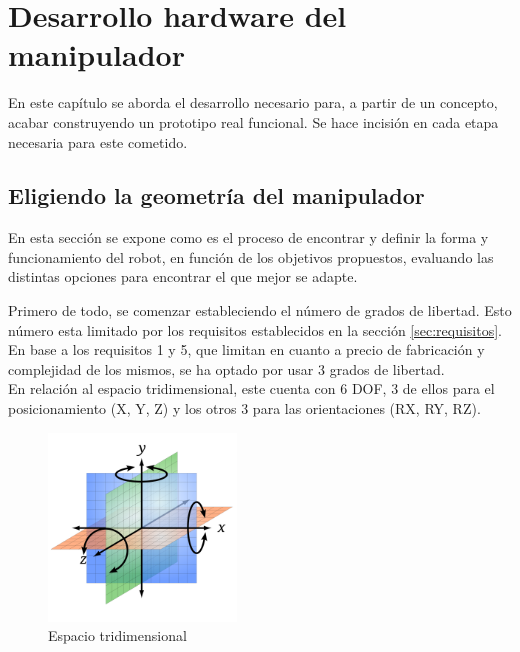 \chapter{Desarrollo hardware del manipulador}
\label{cap:capitulo5}

\vspace{1cm}

\noindent En este capítulo se aborda el desarrollo necesario para, a partir de un concepto, acabar construyendo un prototipo real funcional. Se 
hace incisión en cada etapa necesaria para este cometido.

\section{Eligiendo la geometría del manipulador}
\label{sec:eligiendo_geometría}
En esta sección se expone como es el proceso de encontrar y definir la forma y funcionamiento del robot, en función de 
los objetivos propuestos, evaluando las distintas opciones para encontrar el que mejor se adapte.  


Primero de todo, se comenzar estableciendo el número de grados de libertad. Esto número esta limitado por los requisitos 
establecidos en la sección \ref{sec:requisitos}. En base a los requisitos 1 y 5, que limitan en cuanto a precio de fabricación y 
complejidad de los mismos, se ha optado por usar 3 grados de libertad.\\

En relación al espacio tridimensional, este cuenta con 6 \acs{DOF}, 3 de ellos para el 
posicionamiento (X, Y, Z) y los otros 3 para las orientaciones (RX, RY, RZ).

\begin{figure} [ht!]
  \begin{center}
    \includegraphics[width=5cm]{figs/coordinates.png}
  \end{center}
  \caption{Espacio tridimensional}
  \label{fig:espacio_tridimensional}
\end{figure}\ 

